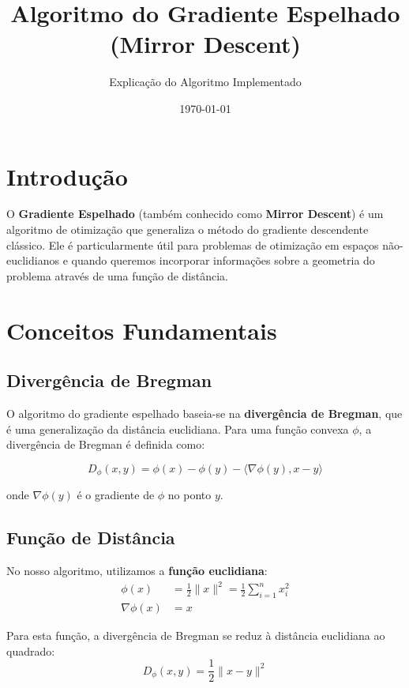 \documentclass[12pt]{article}
\title{Algoritmo do Gradiente Espelhado (Mirror Descent)}
\author{Explicação do Algoritmo Implementado}
\date{\today}
\begin{document}
\maketitle

\section{Introdução}

O \textbf{Gradiente Espelhado} (também conhecido como \textbf{Mirror Descent}) é um algoritmo de otimização que generaliza o método do gradiente descendente clássico. Ele é particularmente útil para problemas de otimização em espaços não-euclidianos e quando queremos incorporar informações sobre a geometria do problema através de uma função de distância.

\section{Conceitos Fundamentais}

\subsection{Divergência de Bregman}

O algoritmo do gradiente espelhado baseia-se na \textbf{divergência de Bregman}, que é uma generalização da distância euclidiana. Para uma função convexa $\phi$, a divergência de Bregman é definida como:

\begin{equation}
D_\phi(x, y) = \phi(x) - \phi(y) - \langle \nabla \phi(y), x - y \rangle
\end{equation}

onde $\nabla \phi(y)$ é o gradiente de $\phi$ no ponto $y$.

\subsection{Função de Distância}

No nosso algoritmo, utilizamos a \textbf{função euclidiana}:
\begin{align}
\phi(x) &= \frac{1}{2}\|x\|^2 = \frac{1}{2}\sum_{i=1}^n x_i^2 \\
\nabla \phi(x) &= x
\end{align}

Para esta função, a divergência de Bregman se reduz à distância euclidiana ao quadrado:
\begin{equation}
D_\phi(x, y) = \frac{1}{2}\|x - y\|^2
\end{equation}
\end{document}

